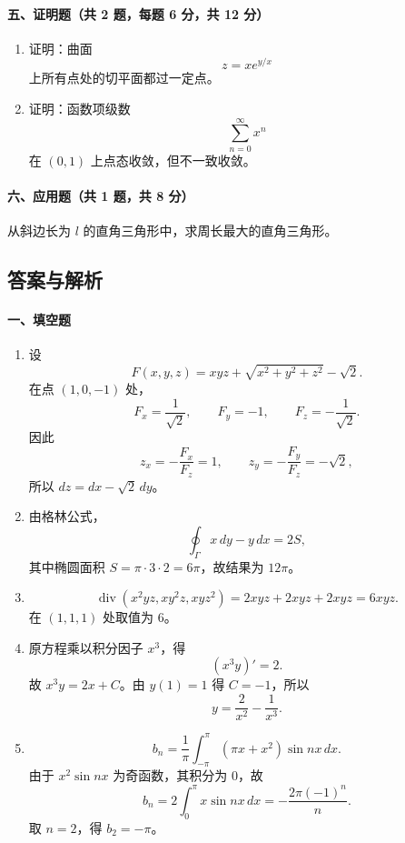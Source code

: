 \paragraph*{五、证明题（共 2 题，每题 6 分，共 12 分）}
\begin{enumerate}
  \item 证明：曲面
  \[
    z=xe^{y/x}
  \]
  上所有点处的切平面都过一定点。

  \item 证明：函数项级数
  \[
    \sum_{n=0}^{\infty}x^n
  \]
  在 $(0,1)$ 上点态收敛，但不一致收敛。
\end{enumerate}

\paragraph*{六、应用题（共 1 题，共 8 分）}
从斜边长为 $l$ 的直角三角形中，求周长最大的直角三角形。

\subsection{答案与解析}

\paragraph*{一、填空题}
\begin{enumerate}
  \item 设
  \[
    F(x,y,z)=xyz+\sqrt{x^2+y^2+z^2}-\sqrt2.
  \]
  在点 $(1,0,-1)$ 处，
  \[
    F_x=\frac1{\sqrt2},\qquad F_y=-1,\qquad F_z=-\frac1{\sqrt2}.
  \]
  因此
  \[
    z_x=-\frac{F_x}{F_z}=1,\qquad z_y=-\frac{F_y}{F_z}=-\sqrt2,
  \]
  所以 $dz=dx-\sqrt2\,dy$。

  \item 由格林公式，
  \[
    \oint_\Gamma x\,dy-y\,dx=2S,
  \]
  其中椭圆面积 $S=\pi\cdot3\cdot2=6\pi$，故结果为 $12\pi$。

  \item
  \[
    \operatorname{div}(x^2yz,xy^2z,xyz^2)
    =2xyz+2xyz+2xyz=6xyz.
  \]
  在 $(1,1,1)$ 处取值为 $6$。

  \item 原方程乘以积分因子 $x^3$，得
  \[
    (x^3y)'=2.
  \]
  故 $x^3y=2x+C$。由 $y(1)=1$ 得 $C=-1$，所以
  \[
    y=\frac{2}{x^2}-\frac{1}{x^3}.
  \]

  \item
  \[
    b_n=\frac1\pi\int_{-\pi}^{\pi}(\pi x+x^2)\sin nx\,dx.
  \]
  由于 $x^2\sin nx$ 为奇函数，其积分为 $0$，故
  \[
    b_n=2\int_0^\pi x\sin nx\,dx=-\frac{2\pi(-1)^n}{n}.
  \]
  取 $n=2$，得 $b_2=-\pi$。
\end{enumerate}

